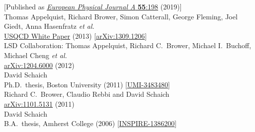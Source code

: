 \begin{spacelist}
\begin{revnumerate}
      {[Published as \href{http://doi.org/10.1140/epja/i2019-12901-5}{\textit{European Physical Journal A} \textbf{55}:198} (2019)]}
    \pagebreakitem
       \\
      Thomas Appelquist, Richard Brower, Simon Catterall, George Fleming, Joel Giedt, Anna Hasenfratz \textit{et al.} \\ %
      \href{http://www.usqcd.org/documents/13BSM.pdf}{USQCD White Paper} (2013) [\href{http://arxiv.org/abs/1309.1206}{arXiv:1309.1206}]
    \pagebreakitem
       \\
      LSD Collaboration: Thomas Appelquist, Richard C.~Brower, Michael I.~Buchoff, Michael Cheng \textit{et al.} \\ %
      \href{http://arxiv.org/abs/1204.6000}{arXiv:1204.6000} (2012)
    \pagebreakitem
       \\
      David Schaich \\
      Ph.D.\ thesis, Boston University (2011) [\href{http://gradworks.umi.com/34/83/3483480.html}{UMI-3483480}]
    \pagebreakitem
       \\
      Richard C.~Brower, Claudio Rebbi and David Schaich \\
      \href{http://arxiv.org/abs/1101.5131}{arXiv:1101.5131} (2011)
    \pagebreakitem
       \\
      David Schaich \\
      B.A.\ thesis, Amherst College (2006) [\href{http://inspirehep.net/record/1386200}{INSPIRE-1386200}] \\
%
%
%
\vspace{18 pt} \hspace{-22 pt}{\large \bfseries Conference proceedings} \vspace{-8 pt}

\end{revnumerate}
\end{spacelist}
